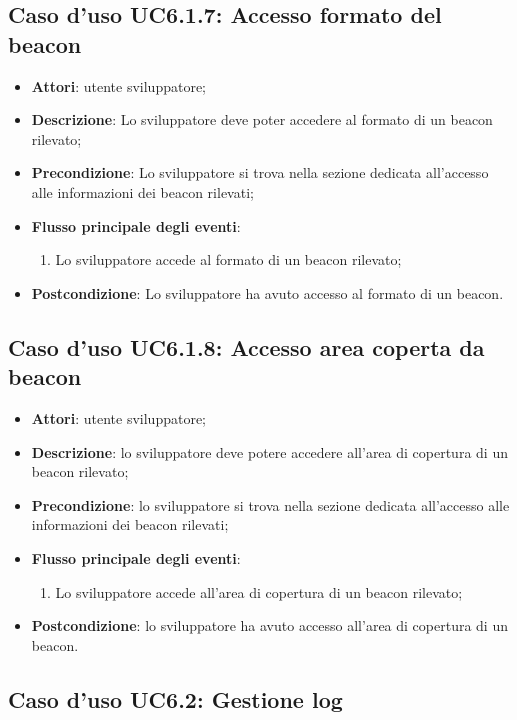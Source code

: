 \documentclass[../AnalisiDeiRequisiti.tex]{subfiles}
\begin{document}
\subsection{Caso d'uso UC6.1.7: Accesso formato del beacon}
\begin{itemize}
	\item \textbf{Attori}: utente sviluppatore;
	\item \textbf{Descrizione}: Lo sviluppatore deve poter accedere al formato di un beacon rilevato; 
	\item \textbf{Precondizione}: Lo sviluppatore si trova nella sezione dedicata all'accesso alle informazioni dei beacon rilevati;
	
	\item \textbf{Flusso principale degli eventi}:
	\begin{enumerate}
		\item Lo sviluppatore accede al formato di un beacon rilevato;
		
	\end{enumerate}
	\item \textbf{Postcondizione}: Lo sviluppatore ha avuto accesso al formato di un beacon.
\end{itemize}
\hypertarget{UC6.1.8}{}
\subsection{Caso d'uso UC6.1.8: Accesso area coperta da beacon}
\begin{itemize}
	\item \textbf{Attori}: utente sviluppatore;
	\item \textbf{Descrizione}: lo sviluppatore deve potere accedere all'area di copertura di un beacon rilevato; 
	\item \textbf{Precondizione}: lo sviluppatore si trova nella sezione dedicata all'accesso alle informazioni dei beacon rilevati;
	
	\item \textbf{Flusso principale degli eventi}:
	\begin{enumerate}
		\item Lo sviluppatore accede all’area di copertura di un beacon rilevato;
		
	\end{enumerate}
	\item \textbf{Postcondizione}: lo sviluppatore ha avuto accesso all’area di copertura di un beacon.
\end{itemize}
\hypertarget{UC6.2}{}
\subsection{Caso d'uso UC6.2: Gestione log}
\end{document}
